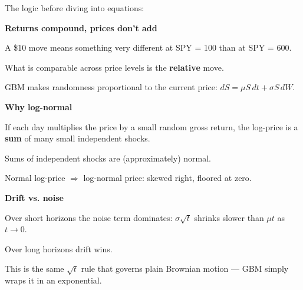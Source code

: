 \documentclass{pyportfolios-note}
\begin{document}
\noteneedroom{140bp}

The logic before diving into equations:

\begin{multicols}{2}
\begin{notebullets}
\item \textbf{Returns compound, prices don't add}
      \begin{notesubbullets}
      \item A \$10 move means something very different at SPY = 100 than at
            SPY = 600.
      \item What is comparable across price levels is the \textbf{relative} move.
      \item GBM makes randomness proportional to the current price:
            $dS = \mu S\,dt + \sigma S\,dW$.
      \end{notesubbullets}
\item \textbf{Why log-normal}
      \begin{notesubbullets}
      \item If each day multiplies the price by a small random gross return, the
            log-price is a \textbf{sum} of many small independent shocks.
      \item Sums of independent shocks are (approximately) normal.
      \item Normal log-price $\Rightarrow$ log-normal price: skewed right,
            floored at zero.
      \end{notesubbullets}
\item \textbf{Drift vs. noise}
      \begin{notesubbullets}
      \item Over short horizons the noise term dominates: $\sigma\sqrt{t}$
            shrinks slower than $\mu t$ as $t \to 0$.
      \item Over long horizons drift wins.
      \item This is the same $\sqrt{t}$ rule that governs plain Brownian
            motion — GBM simply wraps it in an exponential.
      \end{notesubbullets}
\end{notebullets}
\end{multicols}
\end{document}
